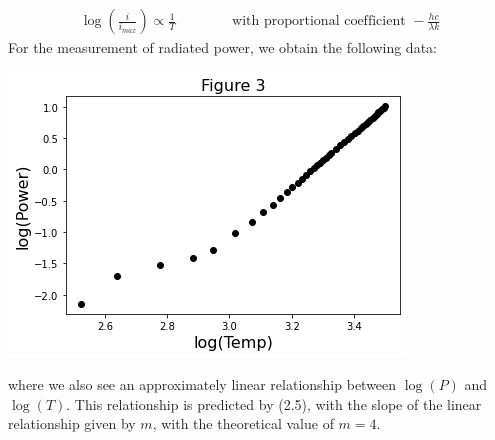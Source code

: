 \documentclass[11pt]{book}
\theoremstyle{break}
\theoremstyle{break}
\begin{document}
\begin{align}
\log\left(\frac{i}{i_{max}}\right) \propto  \frac{1}{T} \qquad\qquad\text{with proportional coefficient }-\frac{hc}{\lambda k}
\end{align}
\newpage
For the measurement of radiated power, we obtain the following data:
\begin{center}
\includegraphics[scale=0.65]{logPvlogT.png}
\end{center}
where we also see an approximately linear relationship between $\log(P)$ and $\log(T)$. This relationship is predicted by (2.5), with the slope of the linear relationship given by $m$, with the theoretical value of $m=4$. \\


\newpage
\end{document}
